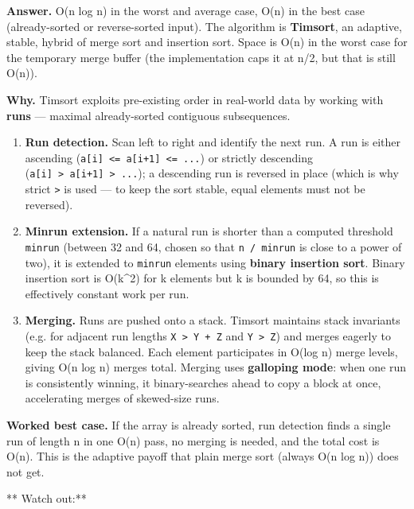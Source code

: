 \documentclass[11pt]{article}
\providecommand{\tightlist}{\setlength{\itemsep}{1pt}\setlength{\parskip}{0pt}}
\begin{document}
\textbf{Answer.} O(n log n) in the worst and average case, O(n) in the best case (already-sorted or reverse-sorted input). The algorithm is \textbf{Timsort}, an adaptive, stable, hybrid of merge sort and insertion sort. Space is O(n) in the worst case for the temporary merge buffer (the implementation caps it at n/2, but that is still O(n)).

\textbf{Why.} Timsort exploits pre-existing order in real-world data by working with \textbf{runs} --- maximal already-sorted contiguous subsequences.

\begin{enumerate}
\def\labelenumi{\arabic{enumi}.}
\tightlist
\item
  \textbf{Run detection.} Scan left to right and identify the next run. A run is either ascending (\texttt{a{[}i{]}\ \textless{}=\ a{[}i+1{]}\ \textless{}=\ ...}) or strictly descending (\texttt{a{[}i{]}\ \textgreater{}\ a{[}i+1{]}\ \textgreater{}\ ...}); a descending run is reversed in place (which is why strict \texttt{\textgreater{}} is used --- to keep the sort stable, equal elements must not be reversed).
\item
  \textbf{Minrun extension.} If a natural run is shorter than a computed threshold \texttt{minrun} (between 32 and 64, chosen so that \texttt{n\ /\ minrun} is close to a power of two), it is extended to \texttt{minrun} elements using \textbf{binary insertion sort}. Binary insertion sort is O(k\^{}2) for k elements but k is bounded by 64, so this is effectively constant work per run.
\item
  \textbf{Merging.} Runs are pushed onto a stack. Timsort maintains stack invariants (e.g. for adjacent run lengths \texttt{X\ \textgreater{}\ Y\ +\ Z} and \texttt{Y\ \textgreater{}\ Z}) and merges eagerly to keep the stack balanced. Each element participates in O(log n) merge levels, giving O(n log n) merges total. Merging uses \textbf{galloping mode}: when one run is consistently winning, it binary-searches ahead to copy a block at once, accelerating merges of skewed-size runs.
\end{enumerate}

\textbf{Worked best case.} If the array is already sorted, run detection finds a single run of length n in one O(n) pass, no merging is needed, and the total cost is O(n). This is the adaptive payoff that plain merge sort (always O(n log n)) does not get.

** Watch out:**
\end{document}
